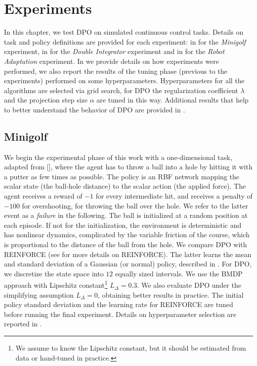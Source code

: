 \chapter{Experiments} \label{chap:exp}
In this chapter, we test \ac{DPO} on simulated continuous control tasks. Details on task and policy definitions are provided for each experiment: in  for the \emph{Minigolf} experiment, in  for the \emph{Double Integrator} experiment and in  for the \emph{Robot Adaptation} experiment. In  we provide details on how experiments were performed, we also report the results of the tuning phase (previous to the experiments) performed on some hyperparameters. Hyperparameters for all the algorithms are selected via grid search, for \ac{DPO} the regularization coefficient $\lambda$ and the projection step size $\alpha$ are tuned in this way. Additional results that help to better understand the behavior of \ac{DPO} are provided in .

\section{Minigolf}\label{sec:mini}
We begin the experimental phase of this work with a one-dimensional task, adapted from [\cite{doro2019gradient}], where the agent has to throw a ball into a hole by hitting it with a putter as few times as possible. The policy is an \ac{RBF} network mapping the scalar state (the ball-hole distance) to the scalar action (the applied force). 
The agent receives a reward of $-1$ for every intermediate hit, and receives a penalty of $-100$ for overshooting, \ie for throwing the ball over the hole. We refer to the latter event as a \textit{failure} in the following.
The ball is initialized at a random position at each episode. If not for the initialization, the environment is deterministic and has nonlinear dynamics, complicated by the variable friction of the course, which is proportional to the distance of the ball from the hole.
We compare \ac{DPO} with REINFORCE (see  for more details on REINFORCE). The latter learns the mean and standard deviation of a Gaussian (or normal) policy, described in .
For \ac{DPO}, we discretize the state space into $12$ equally sized intervals. We use the \ac{BMDP} approach with Lipschitz constant\footnote{We assume to know the Lipschitz constant, but it should be estimated from data or hand-tuned in practice.} $L_{\Delta}=0.3$. We also evaluate \ac{DPO} under the simplifying assumption $L_{\Delta}=0$, obtaining better results in practice.
The initial policy standard deviation and the learning rate for REINFORCE are tuned before running the final experiment.
Details on hyperparameter selection are reported in .

